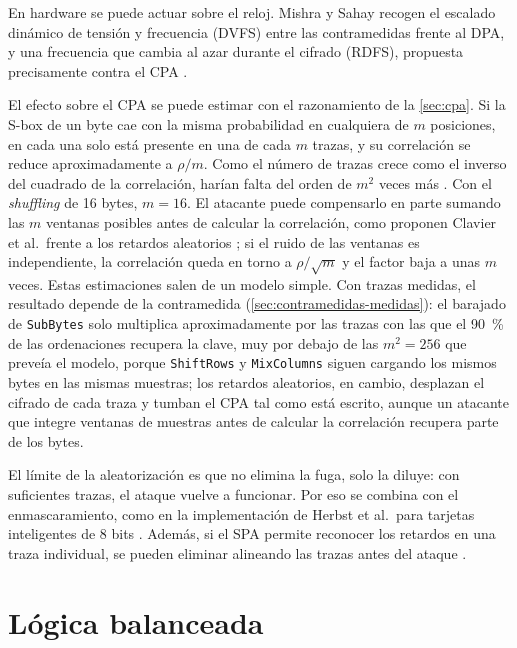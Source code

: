 En hardware se puede actuar sobre el reloj. Mishra y Sahay recogen el
escalado dinámico de tensión y frecuencia (DVFS) entre las contramedidas
frente al DPA, y una frecuencia que cambia al azar durante el cifrado (RDFS),
propuesta precisamente contra el CPA
\cite[secs.~III.D y IV.B]{mishra2025modern}.

El efecto sobre el CPA se puede estimar con el razonamiento de la
\cref{sec:cpa}. Si la S-box de un byte cae con la misma probabilidad en
cualquiera de $m$ posiciones, en cada una solo está presente en una de cada $m$
trazas, y su correlación se reduce aproximadamente a $\rho/m$. Como el número
de trazas crece como el inverso del cuadrado de la correlación, harían falta
del orden de $m^2$ veces más \cite[cap.~8]{mangard2007power}. Con el
\emph{shuffling} de 16 bytes, $m = 16$. El
atacante puede compensarlo en parte sumando las $m$ ventanas posibles antes de
calcular la correlación, como proponen Clavier et al.\ frente a los retardos
aleatorios
\cite{clavier2000countermeasures}; si el ruido de las ventanas es independiente,
la correlación queda en torno a $\rho/\sqrt{m}$ y el factor baja a unas $m$
veces. Estas estimaciones salen de un modelo simple. Con trazas medidas, el
resultado depende de la contramedida (\cref{sec:contramedidas-medidas}): el
barajado de \texttt{SubBytes} solo multiplica aproximadamente por
\realShuffleFactor{} las trazas con las que el 90~\% de las ordenaciones
recupera la clave, muy por debajo de las $m^2 = 256$ que preveía el
modelo, porque \texttt{ShiftRows} y \texttt{MixColumns} siguen cargando los
mismos bytes en las mismas muestras; los retardos aleatorios, en cambio,
desplazan el cifrado de cada traza y tumban el CPA tal como está escrito,
aunque un atacante que integre ventanas de muestras antes de calcular la
correlación recupera parte de los bytes.

El límite de la aleatorización es que no elimina la fuga, solo la diluye: con
suficientes trazas, el ataque vuelve a funcionar. Por eso se combina con el
enmascaramiento, como en la implementación de Herbst et al.\ para tarjetas
inteligentes de 8 bits \cite{herbst2006aes}. Además, si el SPA permite
reconocer los retardos en una traza individual, se pueden eliminar alineando las
trazas antes del ataque \cite[cap.~8]{mangard2007power}.

\section{Lógica balanceada}
\label{sec:logica-balanceada}

